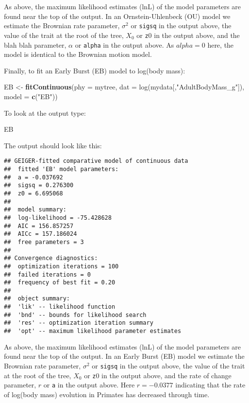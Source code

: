 \documentclass[11pt]{article}
\newcommand{\KeywordTok}[1]{\textcolor[rgb]{0.13,0.29,0.53}{\textbf{{#1}}}}
\newcommand{\DataTypeTok}[1]{\textcolor[rgb]{0.13,0.29,0.53}{{#1}}}
\newcommand{\CharTok}[1]{\textcolor[rgb]{0.31,0.60,0.02}{{#1}}}
\newcommand{\StringTok}[1]{\textcolor[rgb]{0.31,0.60,0.02}{{#1}}}
\newcommand{\NormalTok}[1]{{#1}}
\begin{document}
As above, the maximum likelihood estimates (lnL) of the model parameters are found near the top of the output. In an Ornstein-Uhlenbeck (OU) model we estimate the Brownian rate parameter, $\sigma^2$ or \texttt{sigsq} in the output above, the value of the trait at the root of the tree, $X_0$ or \texttt{z$0$} in the output above, and the blah blah parameter, $\alpha$ or \texttt{alpha} in the output above. As $alpha = 0$ here, the model is identical to the Brownian motion model.

Finally, to fit an Early Burst (EB) model to log(body mass):

\begin{snugshade}
\begin{Highlighting}[]
\NormalTok{EB <-}\StringTok{ }\KeywordTok{fitContinuous}\NormalTok{(\DataTypeTok{phy = }mytree, \DataTypeTok{dat = }log(mydata[,"AdultBodyMass_g"]),} 
                    \DataTypeTok{model = }\KeywordTok{c}\NormalTok{(}\StringTok{"}\CharTok{EB}\StringTok{"}\NormalTok{))}
\end{Highlighting}
\end{snugshade}

To look at the output type:

\begin{snugshade}
\begin{Highlighting}[]
\NormalTok{EB}
\end{Highlighting}
\end{snugshade}

The output should look like this:

\begin{verbatim}
## GEIGER-fitted comparative model of continuous data
##  fitted 'EB' model parameters:
##  a = -0.037692
##  sigsq = 0.276300
##  z0 = 6.695068
## 
##  model summary:
##  log-likelihood = -75.428628
##  AIC = 156.857257
##  AICc = 157.186024
##  free parameters = 3
## 
## Convergence diagnostics:
##  optimization iterations = 100
##  failed iterations = 0
##  frequency of best fit = 0.20
## 
##  object summary:
##  'lik' -- likelihood function
##  'bnd' -- bounds for likelihood search
##  'res' -- optimization iteration summary
##  'opt' -- maximum likelihood parameter estimates
\end{verbatim}

As above, the maximum likelihood estimates (lnL) of the model parameters are found near the top of the output. In an Early Burst (EB) model we estimate the Brownian rate parameter, $\sigma^2$ or \texttt{sigsq} in the output above, the value of the trait at the root of the tree, $X_0$ or \texttt{z$0$} in the output above, and the rate of change parameter, $r$ or \texttt{a} in the output above. Here $r = -0.0377$ indicating that the rate of log(body mass) evolution in Primates has decreased through time.
\end{document}
